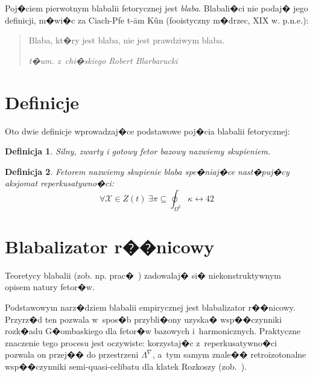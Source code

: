 \documentclass[licencjacka]{pracamgr}
\newtheorem{defi}{Definicja}[section]
\begin{document}
Poj�ciem pierwotnym blabalii fetorycznej jest \emph{blaba}.
Blabali�ci nie podaj� jego definicji, m�wi�c za Ciach-Pfe t-\=am
K\^un (fooistyczny m�drzec, XIX w. p.n.e.):
\begin{quote}
  Blaba, kt�ry jest blaba, nie jest prawdziwym blaba.

\raggedleft\slshape t�um. z~chi�skiego Robert Blarbarucki
\end{quote}

\section{Definicje}

Oto dwie definicje wprowadzaj�ce podstawowe poj�cia blabalii
fetorycznej:

\begin{defi}\label{skupienie}
  Silny, zwarty i gotowy fetor bazowy nazwiemy \emph{skupieniem}.
\end{defi}

\begin{defi}\label{fetor}
  \emph{Fetorem} nazwiemy skupienie blaba spe�niaj�ce nast�puj�cy
  \emph{aksjomat reperkusatywno�ci}:
  $$\forall \mathcal{X}\in Z(t)\ \exists
  \pi\subseteq\oint_{\Omega^2}\kappa\leftrightarrow 42$$
\end{defi}


\section{Blabalizator r��nicowy}

Teoretycy blabalii (zob. np. prac�~\cite{grglo}) zadowalaj� si�
niekonstruktywnym opisem natury fetor�w.

Podstawowym narz�dziem blabalii empirycznej jest blabalizator
r��nicowy.  Przyrz�d ten pozwala w~spos�b przybli�ony uzyska�
wsp��czynniki rozk�adu G�ombaskiego dla fetor�w bazowych
i~harmonicznych.  Praktyczne znaczenie tego procesu jest oczywiste:
korzystaj�c z~reperkusatywno�ci pozwala on przej�� do przestrzeni
$\Lambda^{\nabla}$, a~tym samym znale�� retroizotonalne wsp��czynniki
semi-quasi-celibatu dla klatek Rozkoszy (zob.~\cite{JR}).
\end{document}
